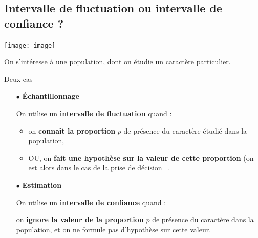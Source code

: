 \documentclass[12pt,french]{book}
\begin{document}
\begin{spacing}{1.2}
\begin{enumerate}
\begin{minipage}{0.95\linewidth}
\begin{alterqcm}[VF,lq=125mm,correction,
symb = \dingsquare,
corsymb = \dingchecksquare]
\AQquestion[br=1]{Pour tout $x \in ]-3~;~2],~f'(x) \geqslant 0$.}
\end{alterqcm}
\end{minipage}

\end{enumerate}
\newpage
\subsection{Intervalle de fluctuation ou intervalle de confiance ?}


\begin{center}
\texttt{[image: image]}
\end{center}

On s'intéresse à une population, dont on étudie un caractère particulier.

\medskip

\begin{bclogo}[couleur = gray!30 , arrondi = 0.1 ,logo = \bclampe , barre = snake , tailleOndu = 1.5]{Deux cas}
\begin{itemize}
\item[$\bullet$] \textbf{\'Echantillonnage}

On utilise un \textbf{intervalle de fluctuation} quand :
	\begin{itemize}
	\item on \textbf{connaît la proportion} $p$ de présence du caractère étudié dans la population,
	\item OU, on \textbf{fait une hypothèse sur la valeur de cette proportion} (on est alors dans le cas de la \og prise de décision\fg~ .
	\end{itemize}

\item[$\bullet$] \textbf{Estimation}

On utilise un \textbf{intervalle de confiance} quand :

on \textbf{ignore la valeur de la proportion} $p$ de présence du caractère dans la population, et on ne formule pas d'hypothèse sur cette valeur.
\end{itemize}
\end{bclogo}


\end{spacing}
\end{document}

